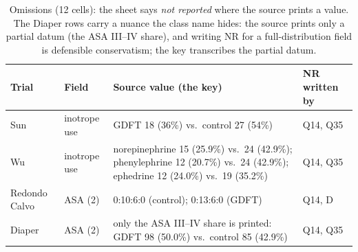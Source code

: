 \documentclass[11pt]{article}
\begin{document}
\begin{table}[H]
\centering\footnotesize
\caption{Omissions (12 cells): the sheet says \emph{not reported} where the source prints a value. The Diaper rows carry a nuance the class name hides: the source prints only a partial datum (the ASA III--IV share), and writing NR for a full-distribution field is defensible conservatism; the key transcribes the partial datum.}
\setlength{\tabcolsep}{4pt}
\begin{tabular}{p{2.1cm}p{2.3cm}p{7.4cm}p{2.2cm}}
\toprule
Trial & Field & Source value (the key) & NR written by \\
\midrule
Sun & inotrope use & GDFT 18 (36\%) vs.\ control 27 (54\%) & Q14, Q35 \\
Wu & inotrope use & norepinephrine 15 (25.9\%) vs.\ 24 (42.9\%); phenylephrine 12 (20.7\%) vs.\ 24 (42.9\%); ephedrine 12 (24.0\%) vs.\ 19 (35.2\%) & Q14, Q35 \\
Redondo Calvo & ASA (2) & 0:10:6:0 (control); 0:13:6:0 (GDFT) & Q14, D \\
Diaper & ASA (2) & only the ASA III--IV share is printed: GDFT 98 (50.0\%) vs.\ control 85 (42.9\%) & Q14, Q35 \\
\bottomrule
\end{tabular}
\end{table}
\end{document}
